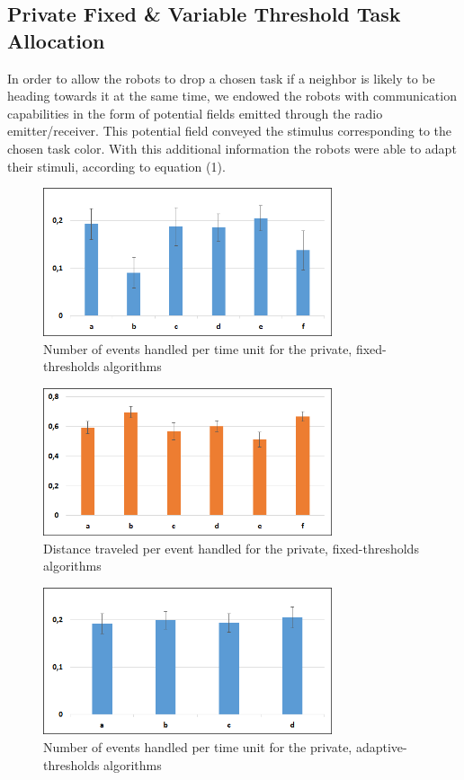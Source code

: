\subsection{Private Fixed \& Variable Threshold Task Allocation}
In order to allow the robots to drop a chosen task if a neighbor is likely to be heading towards it at the same time, we endowed the robots with communication capabilities in the form of potential fields emitted through the radio emitter/receiver. This potential field conveyed the stimulus corresponding to the chosen task color. With this additional information the robots were able to adapt their stimuli, according to equation (1).



   \begin{figure}[thpb]
      \centering
      \includegraphics[width=8.5cm]{Pictures/PrivFixedMetric1.png}
      \caption{Number of events handled per time unit for the private, fixed-thresholds algorithms}
      \label{figure1}
   \end{figure}
	 \begin{figure}[thpb]
      \centering
      \includegraphics[width=8.5cm]{Pictures/PrivFixedMetric2.png}
      \caption{Distance traveled per event handled for the private, fixed-thresholds algorithms}
      \label{figure2}
   \end{figure}
	\begin{figure}[thpb]
      \centering
      \includegraphics[width=8.5cm]{Pictures/PrivAdaptMetric1.png}
      \caption{Number of events handled per time unit for the private, adaptive-thresholds algorithms}
      \label{figure3}
   \end{figure}
